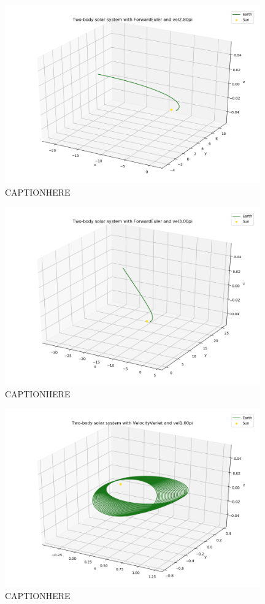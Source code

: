 \documentclass{article}
\begin{document}
    \begin{figure}[H]
        \centering
        \includegraphics[width = 11cm]{img/plot3D_S_E_F_vel280pi.png}
        \caption{CAPTIONHERE}
        \label{fig:plot3D_S_E_F_vel280pi}
    \end{figure}

    \begin{figure}[H]
        \centering
        \includegraphics[width = 11cm]{img/plot3D_S_E_F_vel300pi.png}
        \caption{CAPTIONHERE}
        \label{fig:plot3D_S_E_F_vel300pi}
    \end{figure}

    \begin{figure}[H]
        \centering
        \includegraphics[width = 11cm]{img/plot3D_S_E_V_vel100pi.png}
        \caption{CAPTIONHERE}
        \label{fig:plot3D_S_E_V_vel100pi}
    \end{figure}
\end{document}
